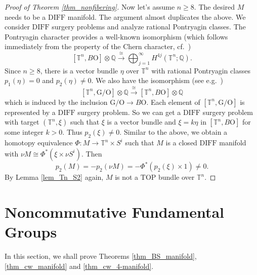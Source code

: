 \documentclass[12pt]{amsart}
\theoremstyle{plain}
\theoremstyle{definition}
\theoremstyle{question}
\theoremstyle{remark}
\theoremstyle{assumption}
\numberwithin{equation}{section}
\theoremstyle{bigthm}
\begin{document}
\begin{proof}[Proof of Theorem \ref{thm_nonfibering}]
Now let's assume $n \ge 8$. The desired $M$ needs to be a $\mathrm{DIFF}$ manifold. The argument almost duplicates the above. We consider $\mathrm{DIFF}$ surgery problems and analyze rational Pontryagin classes. The Pontryagin character provides a well-known isomorphism (which follows immediately from the property of the Chern character, cf.~\cite[p.~19]{Atiyah_Hirzebruch})
\[
[\mathbb{T}^{n}, B\mathrm{O}] \otimes \mathbb{Q} \overset{\cong}{\longrightarrow} \bigoplus_{j=1}^{\infty} H^{4j} (\mathbb{T}^{n}; \mathbb{Q}).
\]
Since $n \ge 8$, there is a vector bundle $\eta$ over $\mathbb{T}^{n}$ with rational Pontryagin classes $p_{1} (\eta) =0$ and $p_{2} (\eta) \ne 0$. We also have the isomorphism (see e.g.~\cite[\S~9.2]{Ranicki})
\[
[\mathbb{T}^{n}, \mathrm{G} /\mathrm{O}] \otimes \mathbb{Q} \overset{\cong}{\longrightarrow} [\mathbb{T}^{n}, B\mathrm{O}] \otimes \mathbb{Q}
\]
which is induced by the inclusion $\mathrm{G} /\mathrm{O} \rightarrow B\mathrm{O}$. Each element of $[\mathbb{T}^{n}, \mathrm{G} /\mathrm{O}]$ is represented by a $\mathrm{DIFF}$ surgery problem. So we can get a $\mathrm{DIFF}$ surgery problem with target $(\mathbb{T}^{n}, \xi)$ such that $\xi$ is a vector bundle and $\xi = k \eta$ in $[\mathbb{T}^{n}, B\mathrm{O}]$ for some integer $k>0$. Thus $p_{2} (\xi) \ne 0$. Similar to the above, we obtain a homotopy equivalence $\Phi \colon  M \rightarrow \mathbb{T}^{n} \times S^{i}$ such that $M$ is a closed $\mathrm{DIFF}$ manifold with $\nu M \cong \Phi^{*} (\xi \times \nu S^{i})$. Then
\[
p_{2} (M) = - p_{2} (\nu M) = - \Phi^{*} (p_{2} (\xi) \times 1) \ne 0.
\]
By Lemma \ref{lem_Tn_S2} again, $M$ is not a $\mathrm{TOP}$ bundle over $\mathbb{T}^{n}$.
\end{proof}

\section{Noncommutative Fundamental Groups}\label{sec_noncommutative}
In this section, we shall prove Theorems \ref{thm_BS_manifold}, \ref{thm_cw_manifold} and \ref{thm_cw_4-manifold}.
\end{document}
